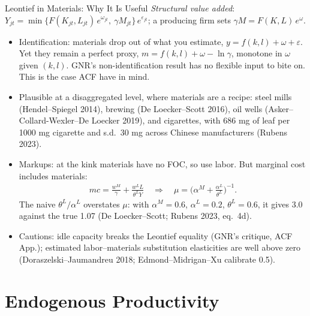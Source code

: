 \documentclass[aspectratio=169,10pt]{beamer}
\begin{document}
\begin{frame}{Leontief in Materials: Why It Is Useful}
\footnotesize
\textit{Structural value added}: \quad $Y_{jt} = \min\big\{F(K_{jt}, L_{jt})\, e^{\omega_{jt}},\ \gamma M_{jt}\big\}\, e^{\varepsilon_{jt}}$; a producing firm sets $\gamma M = F(K,L)\,e^{\omega}$.
\begin{itemize}
\item \alert{Identification}: materials drop out of what you estimate, $y = f(k,l) + \omega + \varepsilon$. Yet they remain a perfect proxy, $m = f(k,l) + \omega - \ln\gamma$, monotone in $\omega$ given $(k,l)$. GNR's non-identification result has no flexible input to bite on. This is the case ACF have in mind.
\item \alert{Plausible} at a disaggregated level, where materials are a recipe: steel mills (Hendel--Spiegel 2014), brewing (De Loecker--Scott 2016), oil wells (Asker--Collard-Wexler--De Loecker 2019), and cigarettes, with 686 mg of leaf per 1000 mg cigarette and s.d.\ 30 mg across Chinese manufacturers (Rubens 2023).
\item \alert{Markups}: at the kink materials have no FOC, so use labor. But marginal cost includes materials:
\begin{align*}
mc = \frac{w^M}{\gamma} + \frac{w^L L}{\theta^L Y} \quad\Longrightarrow\quad \mu = \Big(\alpha^M + \frac{\alpha^L}{\theta^L}\Big)^{-1}.
\end{align*}
The naive $\theta^L/\alpha^L$ overstates $\mu$: with $\alpha^M = 0.6$, $\alpha^L = 0.2$, $\theta^L = 0.6$, it gives 3.0 against the true 1.07 (De Loecker--Scott; Rubens 2023, eq.\ 4d).
\item \alert{Cautions}: idle capacity breaks the Leontief equality (GNR's critique, ACF App.); estimated labor--materials substitution elasticities are well above zero (Doraszelski--Jaumandreu 2018; Edmond--Midrigan--Xu calibrate 0.5).
\end{itemize}
\end{frame}


\section{Endogenous Productivity}
\end{document}
